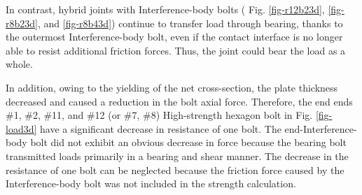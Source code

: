 In contrast, hybrid joints with Interference-body bolts ( Fig. \ref{fig-r12b23d}, \ref{fig-r8b23d}, and \ref{fig-r8b43d}) continue to transfer load through bearing, thanks to the outermost Interference-body bolt, even if the contact interface is no longer able to resist additional friction forces. Thus, the joint could bear the load as a whole.

In addition, owing to the yielding of the net cross-section, the plate thickness decreased and caused a reduction in the bolt axial force. Therefore, the end ends \#1, \#2, \#11, and \#12 (or \#7, \#8) High-strength hexagon bolt in Fig. \ref{fig-load3d} have a significant decrease in resistance of one bolt. The end-Interference-body bolt did not exhibit an obvious decrease in force because the bearing bolt transmitted loads primarily in a bearing and shear manner. The decrease in the resistance of one bolt can be neglected because the friction force caused by the Interference-body bolt was not included in the strength calculation.

